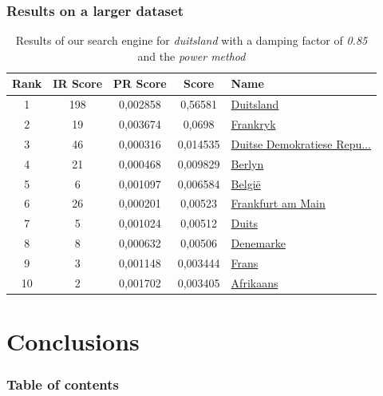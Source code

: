 \documentclass[10pt]{beamer}
\begin{document}
\begin{frame}
  \frametitle{Results on a larger dataset}
  \begin{table}
    \begin{tabular}{ | c | c | c | c | l | }
      \hline
      Rank & IR Score & PR Score &  Score & Name \\ \hline
      1 & 198 & 0,002858 & 0,56581 & \href{http://af.wikipedia.org/wiki/Duitsland}{Duitsland} \\ \hline
      2 & 19 & 0,003674 & 0,0698 & \href{http://af.wikipedia.org/wiki/Frankryk}{Frankryk} \\ \hline
      3 & 46 & 0,000316 & 0,014535 & \href{http://af.wikipedia.org/wiki/Duitse_Demokratiese_Republiek}{Duitse Demokratiese Repu...} \\ \hline
      4 & 21 & 0,000468 & 0,009829 & \href{http://af.wikipedia.org/wiki/Berlyn}{Berlyn} \\ \hline
      5 & 6 & 0,001097 & 0,006584 & \href{http://af.wikipedia.org/wiki/België}{Belgi\"{e}} \\ \hline
      6 & 26 & 0,000201 & 0,00523 & \href{http://af.wikipedia.org/wiki/Frankfurt_am_Main}{Frankfurt am Main} \\ \hline
      7 & 5 & 0,001024 & 0,00512 & \href{http://af.wikipedia.org/wiki/Duits}{Duits} \\ \hline
      8 & 8 & 0,000632 & 0,00506 & \href{http://af.wikipedia.org/wiki/Denemarke}{Denemarke} \\ \hline
      9 & 3 & 0,001148 & 0,003444 & \href{http://af.wikipedia.org/wiki/Frans}{Frans} \\ \hline
      10 & 2 & 0,001702 & 0,003405 & \href{http://af.wikipedia.org/wiki/Afrikaans}{Afrikaans} \\ \hline
    \end{tabular}
    \caption{Results of our search engine for \emph{duitsland} with a damping factor of \emph{0.85} and the \emph{power method}}
    \label{table_larger}
  \end{table}
\end{frame}



\section{Conclusions}

\begin{frame}
  \frametitle{Table of contents}
  \tableofcontents[currentsection]
\end{frame}
\end{document}
